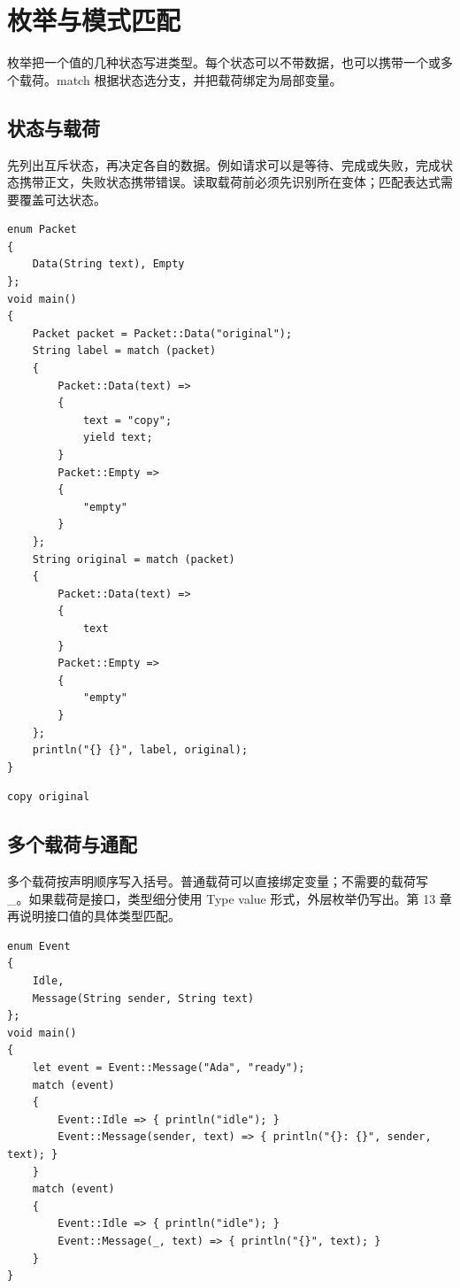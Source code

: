 \chapter{枚举与模式匹配}
\label{ch:10}

枚举把一个值的几种状态写进类型。每个状态可以不带数据，也可以携带一个或多个载荷。match 根据状态选分支，并把载荷绑定为局部变量。

\section{状态与载荷}

先列出互斥状态，再决定各自的数据。例如请求可以是等待、完成或失败，完成状态携带正文，失败状态携带错误。读取载荷前必须先识别所在变体；匹配表达式需要覆盖可达状态。

\par
\medskip
\begin{lstlisting}[style=chali]
enum Packet
{
    Data(String text), Empty
};
void main()
{
    Packet packet = Packet::Data("original");
    String label = match (packet)
    {
        Packet::Data(text) =>
        {
            text = "copy";
            yield text;
        }
        Packet::Empty =>
        {
            "empty"
        }
    };
    String original = match (packet)
    {
        Packet::Data(text) =>
        {
            text
        }
        Packet::Empty =>
        {
            "empty"
        }
    };
    println("{} {}", label, original);
}
\end{lstlisting}
\par
\medskip

\par
\medskip
\begin{lstlisting}[style=out]
copy original
\end{lstlisting}
\par
\medskip

\section{多个载荷与通配}

多个载荷按声明顺序写入括号。普通载荷可以直接绑定变量；不需要的载荷写 \_。如果载荷是接口，类型细分使用 Type value 形式，外层枚举仍写出。第 13 章再说明接口值的具体类型匹配。

\par
\medskip
\begin{lstlisting}[style=chali]
enum Event
{
    Idle,
    Message(String sender, String text)
};
void main()
{
    let event = Event::Message("Ada", "ready");
    match (event)
    {
        Event::Idle => { println("idle"); }
        Event::Message(sender, text) => { println("{}: {}", sender, text); }
    }
    match (event)
    {
        Event::Idle => { println("idle"); }
        Event::Message(_, text) => { println("{}", text); }
    }
}
\end{lstlisting}
\par
\medskip

